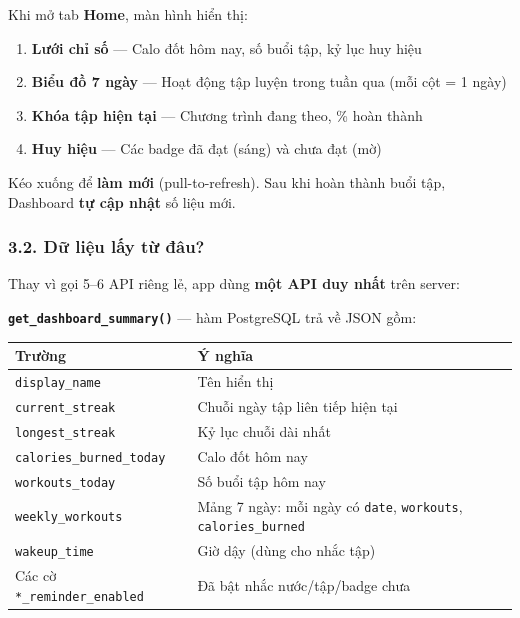 \documentclass[12pt,a4paper]{article}
\newcounter{none}
\providecommand{\tightlist}{%
  \setlength{\itemsep}{0pt}\setlength{\parskip}{0pt}}
\begin{document}
Khi mở tab \textbf{Home}, màn hình hiển thị:

\begin{enumerate}
\def\labelenumi{\arabic{enumi}.}
\tightlist
\item
  \textbf{Lưới chỉ số} --- Calo đốt hôm nay, số buổi tập, kỷ lục huy
  hiệu
\item
  \textbf{Biểu đồ 7 ngày} --- Hoạt động tập luyện trong tuần qua (mỗi
  cột = 1 ngày)
\item
  \textbf{Khóa tập hiện tại} --- Chương trình đang theo, \% hoàn thành
\item
  \textbf{Huy hiệu} --- Các badge đã đạt (sáng) và chưa đạt (mờ)
\end{enumerate}

Kéo xuống để \textbf{làm mới} (pull-to-refresh). Sau khi hoàn thành buổi
tập, Dashboard \textbf{tự cập nhật} số liệu mới.

\subsubsection{3.2. Dữ liệu lấy từ
đâu?}\label{dux1eef-liux1ec7u-lux1ea5y-tux1eeb-ux111uxe2u}

Thay vì gọi 5--6 API riêng lẻ, app dùng \textbf{một API duy nhất} trên
server:

\textbf{\texttt{get\_dashboard\_summary()}} --- hàm PostgreSQL trả về
JSON gồm:

{\def\LTcaptype{none} %
\begin{longtable}[]{@{}
  >{\raggedright\arraybackslash}p{}
  >{\raggedright\arraybackslash}p{}@{}}
\toprule\noalign{}
\begin{minipage}[b]{\linewidth}\raggedright
Trường
\end{minipage} & \begin{minipage}[b]{\linewidth}\raggedright
Ý nghĩa
\end{minipage} \\
\midrule\noalign{}
\endhead
\bottomrule\noalign{}
\endlastfoot
\texttt{display\_name} & Tên hiển thị \\
\texttt{current\_streak} & Chuỗi ngày tập liên tiếp hiện tại \\
\texttt{longest\_streak} & Kỷ lục chuỗi dài nhất \\
\texttt{calories\_burned\_today} & Calo đốt hôm nay \\
\texttt{workouts\_today} & Số buổi tập hôm nay \\
\texttt{weekly\_workouts} & Mảng 7 ngày: mỗi ngày có \texttt{date},
\texttt{workouts}, \texttt{calories\_burned} \\
\texttt{wakeup\_time} & Giờ dậy (dùng cho nhắc tập) \\
Các cờ \texttt{*\_reminder\_enabled} & Đã bật nhắc nước/tập/badge
chưa \\
\end{longtable}
}
\end{document}
